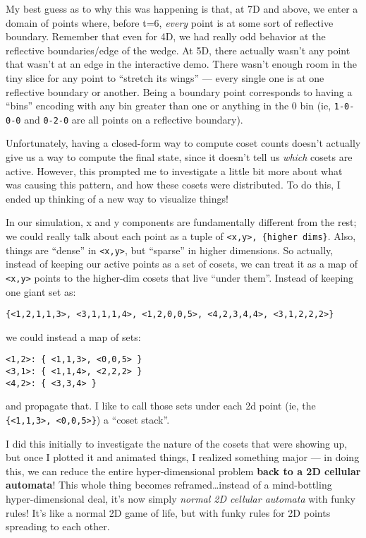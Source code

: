 \documentclass[]{article}
\begin{document}
My best guess as to why this was happening is that, at 7D and above, we enter a
domain of points where, before t=6, \emph{every} point is at some sort of
reflective boundary. Remember that even for 4D, we had really odd behavior at
the reflective boundaries/edge of the wedge. At 5D, there actually wasn't any
point that wasn't at an edge in the interactive demo. There wasn't enough room
in the tiny slice for any point to ``stretch its wings'' --- every single one is
at one reflective boundary or another. Being a boundary point corresponds to
having a ``bins'' encoding with any bin greater than one or anything in the 0
bin (ie, \texttt{1-0-0-0} and \texttt{0-2-0} are all points on a reflective
boundary).

Unfortunately, having a closed-form way to compute coset counts doesn't actually
give us a way to compute the final state, since it doesn't tell us \emph{which}
cosets are active. However, this prompted me to investigate a little bit more
about what was causing this pattern, and how these cosets were distributed. To
do this, I ended up thinking of a new way to visualize things!

In our simulation, x and y components are fundamentally different from the rest;
we could really talk about each point as a tuple of
\texttt{\textless{}x,y\textgreater{},\ \{higher\ dims\}}. Also, things are
``dense'' in \texttt{\textless{}x,y\textgreater{}}, but ``sparse'' in higher
dimensions. So actually, instead of keeping our active points as a set of
cosets, we can treat it as a map of \texttt{\textless{}x,y\textgreater{}} points
to the higher-dim cosets that live ``under them''. Instead of keeping one giant
set as:

\begin{verbatim}
{<1,2,1,1,3>, <3,1,1,1,4>, <1,2,0,0,5>, <4,2,3,4,4>, <3,1,2,2,2>}
\end{verbatim}

we could instead a map of sets:

\begin{verbatim}
<1,2>: { <1,1,3>, <0,0,5> }
<3,1>: { <1,1,4>, <2,2,2> }
<4,2>: { <3,3,4> }
\end{verbatim}

and propagate that. I like to call those sets under each 2d point (ie, the
\texttt{\{\textless{}1,1,3\textgreater{},\ \textless{}0,0,5\textgreater{}\}}) a
``coset stack''.

I did this initially to investigate the nature of the cosets that were showing
up, but once I plotted it and animated things, I realized something major --- in
doing this, we can reduce the entire hyper-dimensional problem \textbf{back to a
2D cellular automata}! This whole thing becomes reframed\ldots instead of a
mind-bottling hyper-dimensional deal, it's now simply \emph{normal 2D cellular
automata} with funky rules! It's like a normal 2D game of life, but with funky
rules for 2D points spreading to each other.
\end{document}
